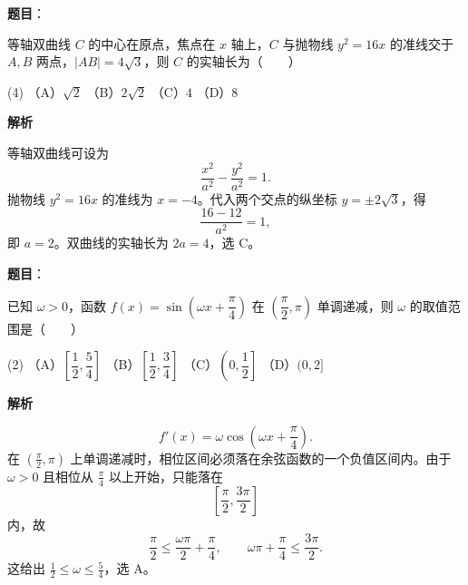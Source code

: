 \begin{answer}

\textbf{题目}：

等轴双曲线 $C$ 的中心在原点，焦点在 $x$ 轴上，$C$ 与抛物线 $y^2=16x$ 的准线交于 $A,B$ 两点，$|AB|=4\sqrt3$，则 $C$ 的实轴长为\mbox{（　　）}

\begin{gkopts}(4)
\task （A）$\sqrt2$
\task （B）$2\sqrt2$
\task （C）$4$
\task （D）$8$
\end{gkopts}

\textbf{解析}

等轴双曲线可设为
\nopagebreak[4]
\[
\frac{x^2}{a^2}-\frac{y^2}{a^2}=1.
\]
抛物线 $y^2=16x$ 的准线为 $x=-4$。代入两个交点的纵坐标 $y=\pm2\sqrt3$，得
\nopagebreak[4]
\[
\frac{16-12}{a^2}=1,
\]
即 $a=2$。双曲线的实轴长为 $2a=4$，选 C。


\end{answer}
\begin{answer}

\textbf{题目}：

已知 $\omega>0$，函数 $f(x)=\sin\left(\omega x+\dfrac{\pi}{4}\right)$ 在 $\left(\dfrac{\pi}{2},\pi\right)$ 单调递减，则 $\omega$ 的取值范围是\mbox{（　　）}

\begin{gkopts}(2)
\task （A）$\left[\dfrac12,\dfrac54\right]$
\task （B）$\left[\dfrac12,\dfrac34\right]$
\task （C）$\left(0,\dfrac12\right]$
\task （D）$(0,2]$
\end{gkopts}

\textbf{解析}

\nopagebreak[4]
\[
f'(x)=\omega\cos\left(\omega x+\frac{\pi}{4}\right).
\]
在 $\left(\frac\pi2,\pi\right)$ 上单调递减时，相位区间必须落在余弦函数的一个负值区间内。由于 $\omega>0$ 且相位从 $\frac\pi4$ 以上开始，只能落在
\nopagebreak[4]
\[
\left[\frac\pi2,\frac{3\pi}2\right]
\]
内，故
\nopagebreak[4]
\[
\frac{\pi}{2}\leqslant\frac{\omega\pi}{2}+\frac\pi4,\qquad
\omega\pi+\frac\pi4\leqslant\frac{3\pi}{2}.
\]
这给出 $\frac12\leqslant\omega\leqslant\frac54$，选 A。


\end{answer}
